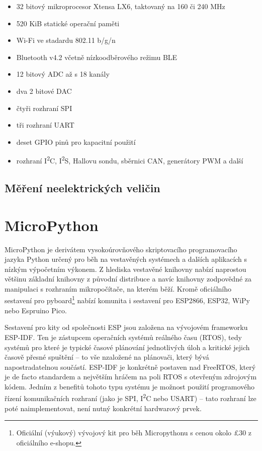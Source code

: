 \begin{itemize}
    \item 32 bitový mikroprocesor Xtensa LX6, taktovaný na 160 či 240 MHz
    \item 520 KiB statické operační paměti
    \item Wi-Fi ve stadardu 802.11 b/g/n
    \item Bluetooth v4.2 včetně nízkoodběrového režimu BLE
    \item 12 bitový ADC až s 18 kanály
    \item dva 2 bitové DAC
    \item čtyři rozhraní SPI
    \item tři rozhraní UART
    \item deset GPIO pinů pro kapacitní použití
    \item rozhraní I\textsuperscript{2}C, I\textsuperscript{2}S, Hallovu sondu, sběrnici CAN, generátory PWM a další
\end{itemize}


\subsection{Měření neelektrických veličin}

\section{MicroPython}\label{sec:micropython}
MicroPython je derivátem vysokoúrovňového skriptovacího programovacího jazyka Python určený pro běh na vestavěných systémech a dalších
aplikacích s nízkým výpočetním výkonem.
Z hlediska vestavěné knihovny nabízí naprostou většinu základní knihovny z původní distribuce a navíc knihovny
zodpovědné za manipulaci s rozhraním mikropočítače, na kterém běží.
Kromě oficiálního sestavení pro pyboard\footnote{Oficiální (výukový) vývojový kit pro běh Micropythonu s
cenou okolo \pounds30 z oficiálního e-shopu.} nabízí komunita i sestavení pro ESP2866, ESP32, WiPy nebo Espruino Pico.

Sestavení pro kity od společnosti ESP jsou založena na vývojovém frameworku ESP-IDF.
Ten je zástupcem operačních systémů reálného času (RTOS), tedy systémů pro které je typické časové plánování jednotlivých úloh
a kritické jejich časově přesné spuštění -- to vše nzaložené na plánovači, který bývá napostradatelnou součástí.
ESP-IDF je konkrétně postaven nad FreeRTOS, který je de facto standardem a největším hráčem na poli RTOS s otevřeným
zdrojovým kódem. 
Jedním z benefitů tohoto typu systému je možnost použití programového řízení komunikačních rozhraní
(jako je SPI, I\textsuperscript{2}C nebo USART) -- tato rozhraní lze poté naimplementovat, není nutný konkrétní hardwarový prvek.

